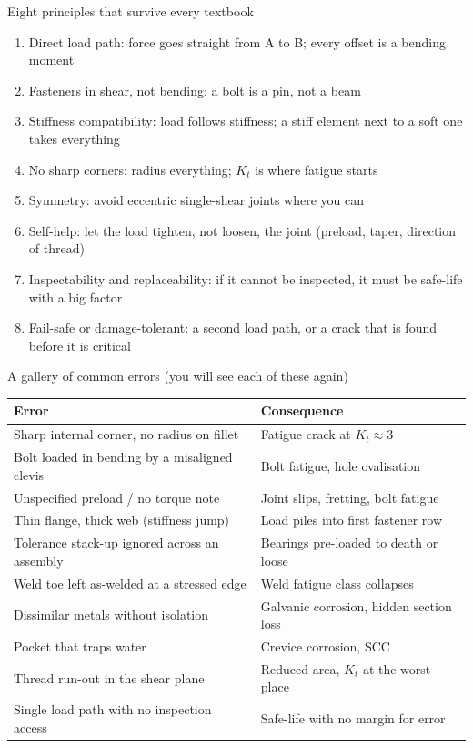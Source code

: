 \documentclass[aspectratio=169,10pt]{beamer}
\begin{document}
\begin{frame}{Eight principles that survive every textbook}
\begin{enumerate}
  \item \alert{Direct load path}: force goes straight from A to B; every offset is a bending moment
  \item \alert{Fasteners in shear, not bending}: a bolt is a pin, not a beam
  \item \alert{Stiffness compatibility}: load follows stiffness; a stiff element next to a soft one takes everything
  \item \alert{No sharp corners}: radius everything; $K_t$ is where fatigue starts
  \item \alert{Symmetry}: avoid eccentric single-shear joints where you can
  \item \alert{Self-help}: let the load tighten, not loosen, the joint (preload, taper, direction of thread)
  \item \alert{Inspectability and replaceability}: if it cannot be inspected, it must be safe-life with a big factor
  \item \alert{Fail-safe or damage-tolerant}: a second load path, or a crack that is found before it is critical
\end{enumerate}
\end{frame}

\begin{frame}{A gallery of common errors (you will see each of these again)}
\scriptsize
\begin{tabular}{@{}p{6.2cm}p{7cm}@{}}
\toprule
Error & Consequence \\
\midrule
Sharp internal corner, no radius on fillet & Fatigue crack at $K_t\approx 3$ \\
Bolt loaded in bending by a misaligned clevis & Bolt fatigue, hole ovalisation \\
Unspecified preload / no torque note & Joint slips, fretting, bolt fatigue \\
Thin flange, thick web (stiffness jump) & Load piles into first fastener row \\
Tolerance stack-up ignored across an assembly & Bearings pre-loaded to death or loose \\
Weld toe left as-welded at a stressed edge & Weld fatigue class collapses \\
Dissimilar metals without isolation & Galvanic corrosion, hidden section loss \\
Pocket that traps water & Crevice corrosion, SCC \\
Thread run-out in the shear plane & Reduced area, $K_t$ at the worst place \\
Single load path with no inspection access & Safe-life with no margin for error \\
\bottomrule
\end{tabular}
\end{frame}
\end{document}
